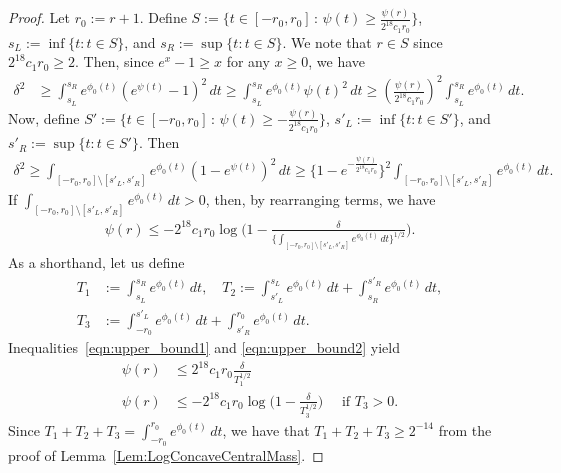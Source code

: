 \documentclass[a4paper,12pt]{article}
\begin{document}
\begin{proof}
Let $r_0 := r + 1$.  Define $S := \bigl\{ t \in [-r_0, r_0] \,:\,  \psi(t) \geq \frac{\psi(r)}{2^{18}c_1r_0} \bigr\}$, $s_L := \inf \{ t:t \in S \}$, and $s_R := \sup \{ t:t \in S \}$.  We note that $r \in S$ since $2^{18}c_1r_0 \geq 2$. Then, since $e^x - 1 \geq x$ for any $x \geq 0$, we have
  \begin{align}
    \delta^2 &\geq  \int_{s_L}^{s_R} e^{\phi_0(t)} (e^{\psi(t)} - 1)^2 \, dt \geq  \int_{s_L}^{s_R} e^{\phi_0(t)} \psi(t)^2  \, dt \geq  \left(\frac{\psi(r)}{2^{18}c_1r_0}\right)^2
               \int_{s_L}^{s_R} e^{\phi_0(t)} \, dt.
                \label{eqn:upper_bound1}
  \end{align}
Now, define $S' := \bigl\{ t \in [-r_0, r_0] \,:\, \psi(t) \geq - \frac{\psi(r)}{2^{18}c_1r_0} \bigr\}$, $s'_L := \inf \{t: t \in S' \}$, and $s'_R := \sup \{t: t \in S' \}$. Then 
  \begin{align*}
    \delta^2 \geq \int_{[-r_0, r_0]\setminus [s'_L, s'_R]} e^{\phi_0(t)} ( 1 - e^{\psi(t)})^2 \, dt \geq \bigl\{ 1 - e^{-\frac{\psi(r)}{2^{18}c_1r_0}} \bigr\}^2 \int_{[-r_0, r_0]\setminus [s'_L, s'_R]} e^{\phi_0(t)} \, dt.
  \end{align*}
If $\int_{[-r_0, r_0]\setminus [s'_L, s'_R]} e^{\phi_0(t)} \, dt > 0$, then, by rearranging terms, we have
  \begin{align}
    \psi(r) \leq   -  2^{18}c_1r_0
    \log \biggl(1-  \frac{\delta}{ \bigl\{ \int_{[-r_0, r_0]\setminus [s'_L, s'_R]} e^{\phi_0(t)} \, dt \bigr\}^{1/2}} \biggr). \label{eqn:upper_bound2}
  \end{align}
 As a shorthand, let us define
  \begin{align*}
    T_1 &:= \int_{s_L}^{s_R} e^{\phi_0(t)} \, dt, \quad
    T_2 := \int_{s'_L}^{s_L} e^{\phi_0(t)} \, dt +  \int_{s_R}^{s'_R} e^{\phi_0(t)} \, dt, \\
    T_3 &:= \int_{-r_0}^{s'_L} e^{\phi_0(t)} \, dt + \int_{s'_R}^{r_0} e^{\phi_0(t)} \, dt.
  \end{align*}
Inequalities~\eqref{eqn:upper_bound1} and \eqref{eqn:upper_bound2} yield
  \begin{align}
    \psi(r) &\leq  2^{18}c_1r_0 \frac{ \delta}{ T_1^{1/2} } \label{Eqn:PsiUpperBound1} \\
    \psi(r) &\leq - 2^{18}c_1r_0 \log \biggl( 1 - \frac{\delta}{T_3^{1/2}} \biggr) \quad \text{ if $T_3 > 0$}. \label{Eqn:PsiUpperBound2}
  \end{align}
 Since $T_1 + T_2 + T_3 = \int_{-r_0}^{r_0} e^{\phi_0(t)} \, dt$, we have that $T_1 + T_2 + T_3 \geq 2^{-14}$ from the proof of Lemma~\ref{Lem:LogConcaveCentralMass}.


\end{proof}
\end{document}
